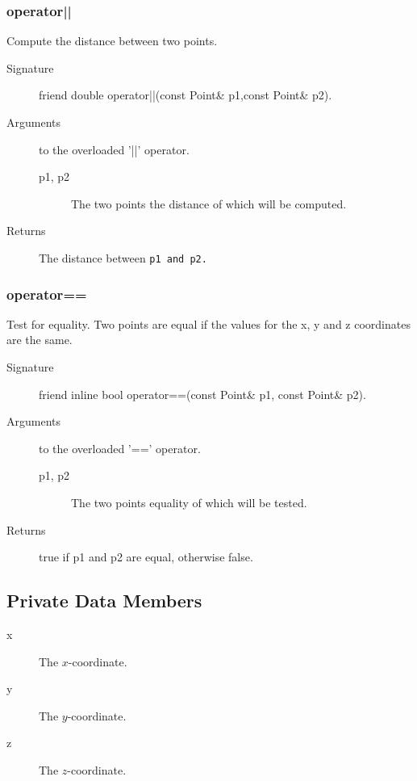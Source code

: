 \subsubsection{operator||}
Compute the distance between two points.
\begin{description}
  \item[Signature] friend double operator||(const Point\& p1,const Point\&
  p2).
  \item[Arguments]  to the overloaded '||' operator.
     \begin{description}
        \item[p1, p2] The two points the distance of which will be
  computed.
      \end{description}
  \item[Returns] The distance between \tt p1 \rm and \tt p2\rm.
\end{description}

\subsubsection{operator==}
Test for equality. Two points are equal if the values for the x, y and z 
coordinates are the same.
\begin{description}
  \item[Signature]  friend inline bool operator==(const Point\& p1,
  const Point\& p2).
    \item[Arguments]  to the overloaded '==' operator.
      \begin{description}
        \item[p1, p2] The two points equality of which will be
  tested.
      \end{description}
  \item[Returns] true if p1 and p2  are equal, otherwise false.
\end{description}

\subsection{Private Data Members}
\begin{description} 
  \item [x] The $x$-coordinate.
  \item [y] The $y$-coordinate.
  \item [z] The $z$-coordinate.
\end{description}


